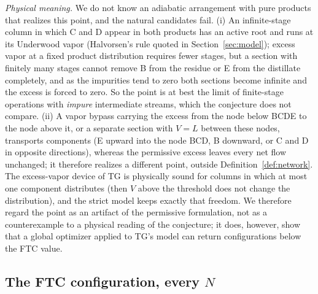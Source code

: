 \documentclass[11pt,a4paper]{report}
\begin{document}
\emph{Physical meaning.} We do not know an adiabatic arrangement with pure products that realizes this point, and
the natural candidates fail. (i) An infinite-stage column in which C and D appear in both products has an active
root and runs at its Underwood vapor (Halvorsen's rule quoted in Section~\ref{sec:model}); excess vapor at a fixed
product distribution requires fewer stages, but a section with finitely many stages cannot remove B from the residue
or E from the distillate completely, and as the impurities tend to zero both sections become infinite and the excess
is forced to zero. So the point is at best the limit of finite-stage operations with \emph{impure} intermediate
streams, which the conjecture does not compare. (ii) A vapor bypass carrying the excess from the node below BCDE to
the node above it, or a separate section with $V=L$ between these nodes, transports components (E upward into the
node BCD, B downward, or C and D in opposite directions), whereas the permissive excess leaves every net flow
unchanged; it therefore realizes a different point, outside Definition~\ref{def:network}. The excess-vapor device of
TG is physically sound for columns in which at most one component distributes (then $V$ above the threshold does not
change the distribution), and the strict model keeps exactly that freedom. We therefore regard the point as an
artifact of the permissive formulation, not as a counterexample to a physical reading of the conjecture; it does,
however, show that a global optimizer applied to TG's model can return configurations below the FTC value.

\subsection{The FTC configuration, every \texorpdfstring{$N$}{N}}
\end{document}
